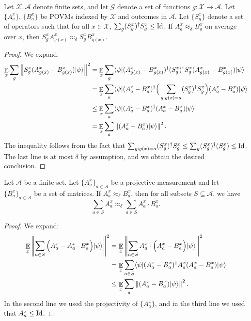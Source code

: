 \begin{fact}
\label{fact:add-a-proj2}
Let $\mathcal{X},\mathcal{A}$ denote finite sets, and let $\mathcal{G}$ denote a set of functions $g: \mathcal{X} \to \mathcal{A}$. Let $\{A^x_a \}$, $\{B^x_a\}$ be POVMs indexed by $\mathcal{X}$ and outcomes in $\mathcal{A}$. Let $\{ S_g^x \}$ denote a set of operators such that for all $x \in \mathcal{X}$, $\sum_g (S_g^x)^\dagger S_g^x \leq \mathop{\rm Id}\nolimits$. 
If $A^x_a \approx_\delta B^x_a$ on average over $x$, then $S_g^x A^x_{g(x)} \approx_\delta S_g^x B^x_{g(x)}$. 
\end{fact}
\begin{proof}
	We expand:
	\begin{align*}
		\mathop{\mathbb{E}}\displaylimits_x \sum_g \left\| { S^x_g (A^x_{g(x)} - B^x_{g(x)}) |\psi\rangle} \right\|^2 &= \mathop{\mathbb{E}}\displaylimits_x \sum_g \langle\psi| (A^x_{g(x)} - B^x_{g(x)})^\dagger  (S_g^x)^\dagger S_g^x (A^x_{g(x)} - B^x_{g(x)}) |\psi\rangle \\
		&= \mathop{\mathbb{E}}\displaylimits_x \sum_a \langle\psi| (A^x_a - B^x_a)^\dagger  \Big(\sum_{g: g(x) = a} (S_g^x)^\dagger S_g^x \Big) (A^x_a - B^x_a) |\psi\rangle \\
		&\leq \mathop{\mathbb{E}}\displaylimits_x \sum_a \langle\psi| (A^x_a - B^x_a)^\dagger (A^x_a - B^x_a) |\psi\rangle \\
		&= \mathop{\mathbb{E}}\displaylimits_x \sum_a \left\| { (A^x_a - B^x_a) |\psi\rangle } \right\|^2.
	\end{align*}
	The inequality follows from the fact that $\sum_{g: g(x) = a} (S_g^x)^\dagger S_g^x \leq \sum_g (S_g^x)^\dagger (S_g^x) \leq \mathop{\rm Id}\nolimits$. The last line is at most $\delta$ by assumption, and we obtain the desired conclusion.
\end{proof}


\begin{lemma}
\label{lem:cool-closeness-fact}
Let $\mathcal{A}$ be a finite set. Let $\{A^x_a\}_{a \in \mathcal{A}}$ be a projective measurement and let $\{B^x_a\}_{a \in \mathcal{A}}$ be a set of matrices. If $A^x_a \approx_\delta B^x_a$, then for all subsets $S \subseteq \mathcal{A}$, we have
\[
	\sum_{a \in S} A^x_a \approx_\delta \sum_{a \in S} A^x_a \cdot B^x_a.
\]
\end{lemma}
\begin{proof}
We expand:
\begin{align*}
	\mathop{\mathbb{E}}\displaylimits_x \left\| { \sum_{a \in S} \Big(A^x_a - A^x_a \cdot B^x_a\Big) |\psi\rangle} \right\|^2 &= \mathop{\mathbb{E}}\displaylimits_x \left\| { \sum_{a \in S} A^x_a \cdot \Big(A^x_a - B^x_a\Big) |\psi\rangle} \right\|^2 \\
	&= \mathop{\mathbb{E}}\displaylimits_x \sum_{a \in S} \langle\psi| (A^x_a - B^x_a)^\dagger A^x_a (A^x_a - B^x_a) |\psi\rangle \\
	&\leq \mathop{\mathbb{E}}\displaylimits_x \sum_a \left\| { (A^x_a -  B^x_a) |\psi\rangle} \right\|^2.
\end{align*}
In the second line we used the projectivity of $\{ A^x_a \}$, and in the third line we used that $A^x_a \leq \mathop{\rm Id}\nolimits$.
\end{proof}


